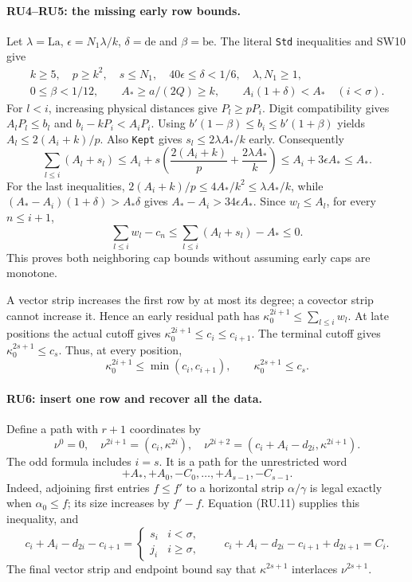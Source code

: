 \documentclass[11pt,a4paper]{article}
\numberwithin{equation}{section}
\theoremstyle{remark}\newtheorem{remark}[theorem]{Remark}
\begin{document}
\paragraph{RU4--RU5: the missing early row bounds.}
Let $\lambda=\mathrm{La}$, $\epsilon=N_1\lambda/k$,
$\delta=\mathrm{de}$ and $\beta=\mathrm{be}$.
The literal \texttt{Std} inequalities and SW10 give
\[
 \begin{gathered}
 k\ge5,\quad p\ge k^2,\quad s\le N_1,\quad
 40\epsilon\le\delta<1/6,\quad \lambda,N_1\ge1,\\
 0\le\beta<1/12,\qquad
 A_*\ge a/(2Q)\ge k,\qquad A_i(1+\delta)<A_*\quad(i<\sigma).
 \end{gathered}                                             \tag{RU.8}
\]
For $l<i$, increasing physical distances give $P_l\ge pP_i$.
Digit compatibility gives $A_lP_l\le b_l$ and
$b_i-kP_i<A_iP_i$. Using
$b'(1-\beta)\le b_i\le b'(1+\beta)$ yields
$A_l\le2(A_i+k)/p$.
Also \texttt{Kept} gives $s_l\le2\lambda A_*/k$ early.
Consequently
\[
 \sum_{l\le i}(A_l+s_l)
 \le A_i+s\left(\frac{2(A_i+k)}p+\frac{2\lambda A_*}k\right)
 \le A_i+3\epsilon A_*\le A_*.                              \tag{RU.9}
\]
For the last inequalities, $2(A_i+k)/p\le4A_*/k^2
\le\lambda A_*/k$, while
$(A_*-A_i)(1+\delta)>A_*\delta$ gives
$A_*-A_i>34\epsilon A_*$.
Since $w_l\le A_l$, for every $n\le i+1$,
\[
 \sum_{l\le i}w_l-c_n
 \le\sum_{l\le i}(A_l+s_l)-A_*\le0.                         \tag{RU.10}
\]
This proves both neighboring cap bounds without assuming early
caps are monotone.

A vector strip increases the first row by at most its degree;
a covector strip cannot increase it. Hence an early residual path
has $\kappa^{2i+1}_0\le\sum_{l\le i}w_l$.
At late positions the actual cutoff gives
$\kappa^{2i+1}_0\le c_i\le c_{i+1}$.
The terminal cutoff gives $\kappa^{2s+1}_0\le c_s$.
Thus, at every position,
\[
 \kappa^{2i+1}_0\le\min(c_i,c_{i+1}),\qquad
 \kappa^{2s+1}_0\le c_s.                                   \tag{RU.11}
\]

\paragraph{RU6: insert one row and recover all the data.}
Define a path with $r+1$ coordinates by
\[
 \nu^0=0,\quad
 \nu^{2i+1}=(c_i,\kappa^{2i}),\quad
 \nu^{2i+2}=(c_i+A_i-d_{2i},\kappa^{2i+1}).                  \tag{RU.12}
\]
The odd formula includes $i=s$.
It is a path for the unrestricted word
\[
                    +A_*,+A_0,-C_0,\ldots,+A_{s-1},-C_{s-1}.
\]
Indeed, adjoining first entries $f\le f'$ to a horizontal strip
$\alpha/\gamma$ is legal exactly when $\alpha_0\le f$;
its size increases by $f'-f$.
Equation (RU.11) supplies this inequality, and
\[
 c_i+A_i-d_{2i}-c_{i+1}
   =\begin{cases}s_i&i<\sigma,\\j_i&i\ge\sigma,\end{cases}
 \qquad
 c_i+A_i-d_{2i}-c_{i+1}+d_{2i+1}=C_i.                      \tag{RU.13}
\]
The final vector strip and endpoint bound say that
$\kappa^{2s+1}$ interlaces $\nu^{2s+1}$.
\end{document}
